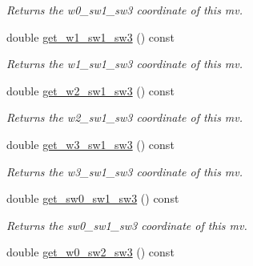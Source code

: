 \begin{DoxyCompactItemize}
\begin{DoxyCompactList}\small\item\em Returns the w0\-\_\-sw1\-\_\-sw3 coordinate of this mv. \end{DoxyCompactList}\item 
\hypertarget{classe3ga_1_1mv_aeb29c924211ca20e2f36dc45edae640e}{double \hyperlink{classe3ga_1_1mv_aeb29c924211ca20e2f36dc45edae640e}{get\-\_\-w1\-\_\-sw1\-\_\-sw3} () const }\label{classe3ga_1_1mv_aeb29c924211ca20e2f36dc45edae640e}

\begin{DoxyCompactList}\small\item\em Returns the w1\-\_\-sw1\-\_\-sw3 coordinate of this mv. \end{DoxyCompactList}\item 
\hypertarget{classe3ga_1_1mv_aa9405ac2579baf986ac792e0eb89ed3b}{double \hyperlink{classe3ga_1_1mv_aa9405ac2579baf986ac792e0eb89ed3b}{get\-\_\-w2\-\_\-sw1\-\_\-sw3} () const }\label{classe3ga_1_1mv_aa9405ac2579baf986ac792e0eb89ed3b}

\begin{DoxyCompactList}\small\item\em Returns the w2\-\_\-sw1\-\_\-sw3 coordinate of this mv. \end{DoxyCompactList}\item 
\hypertarget{classe3ga_1_1mv_a8a56472b1e9a66f8b3e3838251a5ba93}{double \hyperlink{classe3ga_1_1mv_a8a56472b1e9a66f8b3e3838251a5ba93}{get\-\_\-w3\-\_\-sw1\-\_\-sw3} () const }\label{classe3ga_1_1mv_a8a56472b1e9a66f8b3e3838251a5ba93}

\begin{DoxyCompactList}\small\item\em Returns the w3\-\_\-sw1\-\_\-sw3 coordinate of this mv. \end{DoxyCompactList}\item 
\hypertarget{classe3ga_1_1mv_a50a03379d093592d3346c31c53e4bc5e}{double \hyperlink{classe3ga_1_1mv_a50a03379d093592d3346c31c53e4bc5e}{get\-\_\-sw0\-\_\-sw1\-\_\-sw3} () const }\label{classe3ga_1_1mv_a50a03379d093592d3346c31c53e4bc5e}

\begin{DoxyCompactList}\small\item\em Returns the sw0\-\_\-sw1\-\_\-sw3 coordinate of this mv. \end{DoxyCompactList}\item 
\hypertarget{classe3ga_1_1mv_a1871294161f1af7eccfb5c9ccf00b4aa}{double \hyperlink{classe3ga_1_1mv_a1871294161f1af7eccfb5c9ccf00b4aa}{get\-\_\-w0\-\_\-sw2\-\_\-sw3} () const }\label{classe3ga_1_1mv_a1871294161f1af7eccfb5c9ccf00b4aa}


\end{DoxyCompactItemize}
